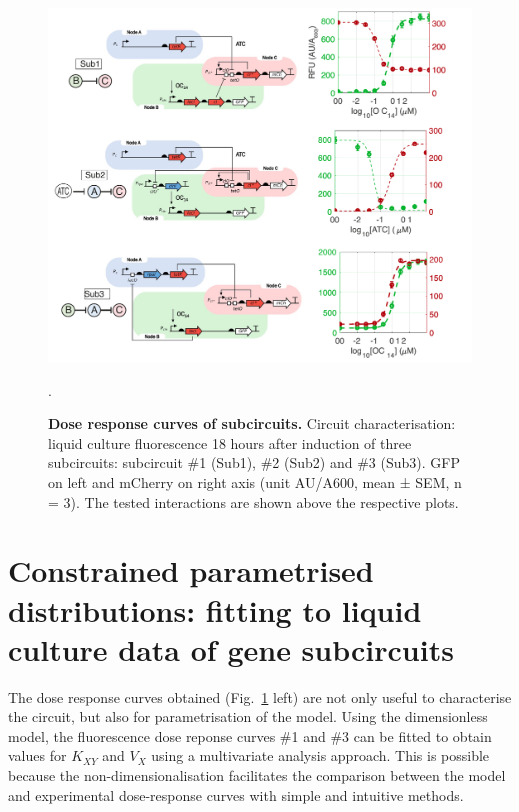 \begin{figure}[H] %
    \centering
    \begin{adjustbox}{center}
        \includegraphics[width=1\textwidth]{chapters/Chapter 2/dose_response_experimental} %
    \end{adjustbox}
    \caption{\textbf{Dose response curves of subcircuits.} Circuit characterisation: liquid culture fluorescence 18 hours after induction of three subcircuits: subcircuit \#1 (Sub1), \#2 (Sub2) and \#3 (Sub3). GFP on left and mCherry on right axis (unit AU/A600, mean ± SEM, n = 3). The tested interactions are shown above the respective plots.}.
    \label{fig:dose_response_experimental} %
\end{figure}
\section{Constrained parametrised distributions: fitting to liquid culture data of gene subcircuits}\label{Constrained parametrised distributions: fitting to liquid culture data of gene subcircuits}
The dose response curves obtained (Fig.~\ref{fig:dose_response_experimental} left) are not only useful to characterise the circuit, but also for parametrisation of the model.
Using the dimensionless model, the fluorescence dose reponse curves \#1 and \#3 can be fitted to obtain values for $K_{XY}$ and $V_{X}$ using a multivariate analysis approach.
This is possible because the non-dimensionalisation facilitates the comparison between the model and experimental dose-response curves with simple and intuitive methods.


